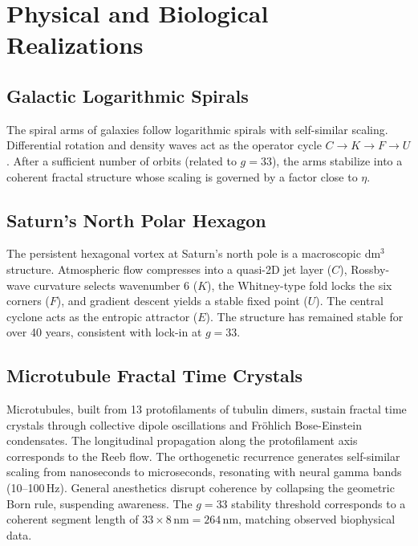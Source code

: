 \documentclass[11pt,a4paper]{article}
\theoremstyle{definition}
\theoremstyle{remark}
\begin{document}
\section{Physical and Biological Realizations}

\subsection{Galactic Logarithmic Spirals}

The spiral arms of galaxies follow logarithmic spirals with self-similar scaling. Differential
rotation and density waves act as the operator cycle $C\to K\to F\to U$. After a sufficient
number of orbits (related to $g=33$), the arms stabilize into a coherent fractal structure
whose scaling is governed by a factor close to $\eta$.

\subsection{Saturn's North Polar Hexagon}

The persistent hexagonal vortex at Saturn's north pole is a macroscopic dm$^3$ structure.
Atmospheric flow compresses into a quasi-2D jet layer ($C$), Rossby-wave curvature selects
wavenumber 6 ($K$), the Whitney-type fold locks the six corners ($F$), and gradient descent
yields a stable fixed point ($U$). The central cyclone acts as the entropic attractor ($E$).
The structure has remained stable for over 40 years, consistent with lock-in at $g=33$.

\subsection{Microtubule Fractal Time Crystals}

Microtubules, built from 13 protofilaments of tubulin dimers, sustain fractal time crystals
through collective dipole oscillations and Fr\"{o}hlich Bose-Einstein condensates. The
longitudinal propagation along the protofilament axis corresponds to the Reeb flow. The
orthogenetic recurrence generates self-similar scaling from nanoseconds to microseconds,
resonating with neural gamma bands (10--100\,Hz). General anesthetics disrupt coherence by
collapsing the geometric Born rule, suspending awareness. The $g=33$ stability threshold
corresponds to a coherent segment length of $33\times8\,\text{nm}=264\,\text{nm}$, matching
observed biophysical data.
\end{document}
